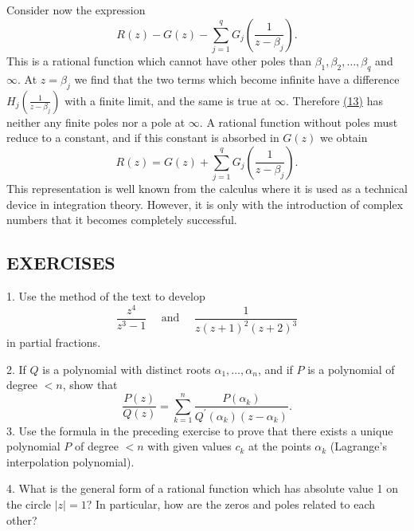 Consider now the expression
\begin{equation*}
R (z) - G (z) - \sum_ {j = 1} ^ {q} G _ {j} \left(\frac {1}{z - \beta_ {j}}\right).\tag{13}\label{eq:2.13}
\end{equation*}
This is a rational function which cannot have other poles than $\beta_{1}, \beta_{2}, \ldots, \beta_{q}$ and $\infty$. At $z = \beta_{j}$ we find that the two terms which become infinite have a difference $H_{j}\left(\frac{1}{z - \beta_{j}}\right)$ with a finite limit, and the same is true at $\infty$. Therefore \hyperref[eq:2.13]{(13)} has neither any finite poles nor a pole at $\infty$. A rational function without poles must reduce to a constant, and if this constant is absorbed in $G(z)$ we obtain
\begin{equation*}
R (z) = G (z) + \sum_ {j = 1} ^ {q} G _ {j} \left(\frac {1}{z - \beta_ {j}}\right).\tag{14}\label{eq:2.14}
\end{equation*}
This representation is well known from the calculus where it is used as a technical device in integration theory. However, it is only with the introduction of complex numbers that it becomes completely successful.

\subsection*{EXERCISES}
1. Use the method of the text to develop
\begin{equation*}
\frac {z ^ {4}}{z ^ {3} - 1} \quad \text { and } \quad \frac {1}{z (z + 1) ^ {2} (z + 2) ^ {3}}
\end{equation*}
in partial fractions.

2. If $Q$ is a polynomial with distinct roots $\alpha_{1}, \ldots, \alpha_{n}$, and if $P$ is a polynomial of degree $< n$, show that
\begin{equation*}
\frac {P (z)}{Q (z)} = \sum_ {k = 1} ^ {n} \frac {P (\alpha_ {k})}{Q ^ {\prime} (\alpha_ {k}) (z - \alpha_ {k})}.
\end{equation*}
3. Use the formula in the preceding exercise to prove that there exists a unique polynomial $P$ of degree $< n$ with given values $c_k$ at the points $\alpha_k$ (Lagrange's interpolation polynomial).


4. What is the general form of a rational function which has absolute value 1 on the circle $|z| = 1$? In particular, how are the zeros and poles related to each other?

